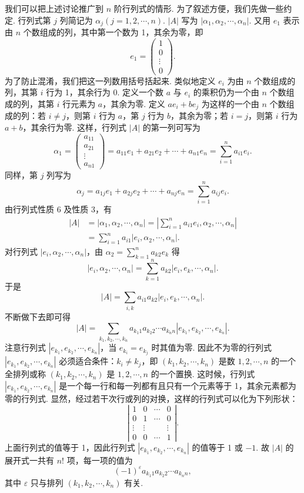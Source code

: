 \documentclass[UTF8,12pt,a4paper,fontset=fandol]{ctexart}
\begin{document}
我们可以把上述讨论推广到 $n$ 阶行列式的情形. 为了叙述方便，我们先做一些约定. 行列式第 $j$ 列简记为 $\alpha_j(j=1,2,\cdots,n)$. $|A|$ 写为 $|\alpha_1,\alpha_2,\cdots,\alpha_n|$. 又用 $e_1$ 表示由 $n$ 个数组成的列，其中第一个数为 1，其余为零，即
\[
e_1=\left(\begin{array}{c}
1\\
0\\
\vdots\\
0
\end{array}\right).
\]
为了防止混淆，我们把这一列数用括号括起来. 类似地定义 $e_i$ 为由 $n$ 个数组成的列，其第 $i$ 行为 1，其余行为 0. 定义一个数 $a$ 与 $e_i$ 的乘积仍为一个由 $n$ 个数组成的列，其第 $i$ 行元素为 $a$，其余为零. 定义 $ae_i+be_j$ 为这样的一个由 $n$ 个数组成的列：若 $i\ne j$，则第 $i$ 行为 $a$，第 $j$ 行为 $b$，其余为零；若 $i=j$，则第 $i$ 行为 $a+b$，其余行为零. 这样，行列式 $|A|$ 的第一列可写为
\[
\alpha_1=
\left(\begin{array}{c}
a_{11}\\
a_{21}\\
\vdots\\
a_{n1}
\end{array}\right)
=a_{11}e_1+a_{21}e_2+\cdots+a_{n1}e_n
=\sum_{i=1}^n a_{i1}e_i.
\]
同样，第 $j$ 列写为
\[
\alpha_j=a_{1j}e_1+a_{2j}e_2+\cdots+a_{nj}e_n
=\sum_{i=1}^n a_{ij}e_i.
\]
由行列式性质 6 及性质 3，有
\[
\begin{aligned}
|A|
&=|\alpha_1,\alpha_2,\cdots,\alpha_n|
=\left|\sum_{i=1}^n a_{i1}e_i,\alpha_2,\cdots,\alpha_n\right|\\
&=\sum_{i=1}^n a_{i1}|e_i,\alpha_2,\cdots,\alpha_n|.
\end{aligned}
\]
对行列式 $|e_i,\alpha_2,\cdots,\alpha_n|$，由 $\alpha_2=\sum_{k=1}^n a_{k2}e_k$ 得
\[
|e_i,\alpha_2,\cdots,\alpha_n|
=\sum_{k=1}^n a_{k2}|e_i,e_k,\cdots,\alpha_n|.
\]
于是
\[
|A|=\sum_{i,k}a_{i1}a_{k2}|e_i,e_k,\cdots,\alpha_n|.
\]
不断做下去即可得
\[
|A|=\sum_{k_1,k_2,\cdots,k_n}
a_{k_1 1}a_{k_2 2}\cdots a_{k_n n}
|e_{k_1},e_{k_2},\cdots,e_{k_n}|.
\]
注意行列式 $|e_{k_1},e_{k_2},\cdots,e_{k_n}|$，当 $e_{k_i}=e_{k_j}$ 时其值为零. 因此不为零的行列式 $|e_{k_1},e_{k_2},\cdots,e_{k_n}|$ 必须适合条件：$k_i\ne k_j$，即 $(k_1,k_2,\cdots,k_n)$ 是数 $1,2,\cdots,n$ 的一个全排列或称 $(k_1,k_2,\cdots,k_n)$ 是 $1,2,\cdots,n$ 的一个置换. 这时候，行列式 $|e_{k_1},e_{k_2},\cdots,e_{k_n}|$ 是一个每一行和每一列都有且只有一个元素等于 1，其余元素都为零的行列式. 显然，经过若干次行或列的对换，这样的行列式可以化为下列形状：
\[
\left|\begin{array}{cccc}
1 & 0 & \cdots & 0\\
0 & 1 & \cdots & 0\\
\vdots & \vdots & & \vdots\\
0 & 0 & \cdots & 1
\end{array}\right|.
\]
上面行列式的值等于 1，因此行列式 $|e_{k_1},e_{k_2},\cdots,e_{k_n}|$ 的值等于 1 或 $-1$. 故 $|A|$ 的展开式一共有 $n!$ 项，每一项的值为
\[
(-1)^\varepsilon a_{k_1 1}a_{k_2 2}\cdots a_{k_n n},
\]
其中 $\varepsilon$ 只与排列 $(k_1,k_2,\cdots,k_n)$ 有关.
\end{document}

